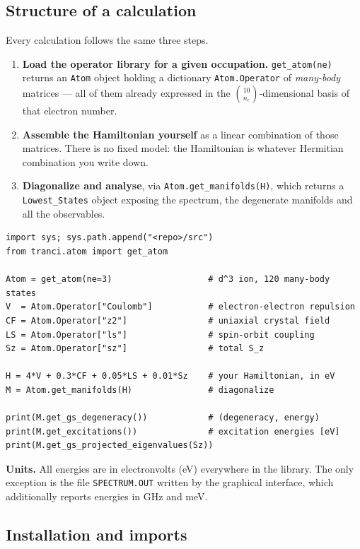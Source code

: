 \documentclass[11pt,a4paper]{article}
\newcommand{\op}[1]{\texttt{#1}}
\begin{document}
\subsection{Structure of a calculation}

Every calculation follows the same three steps.

\begin{enumerate}
\item \textbf{Load the operator library for a given occupation.}
      \op{get\_atom(ne)} returns an \op{Atom} object holding a dictionary
      \op{Atom.Operator} of \emph{many-body} matrices --- all of them already
      expressed in the $\binom{10}{n_e}$-dimensional basis of that electron
      number.
\item \textbf{Assemble the Hamiltonian yourself} as a linear combination of
      those matrices.  There is no fixed model: the Hamiltonian is whatever
      Hermitian combination you write down.
\item \textbf{Diagonalize and analyse}, via
      \op{Atom.get\_manifolds(H)}, which returns a \op{Lowest\_States} object
      exposing the spectrum, the degenerate manifolds and all the observables.
\end{enumerate}

\begin{lstlisting}
import sys; sys.path.append("<repo>/src")
from tranci.atom import get_atom

Atom = get_atom(ne=3)                   # d^3 ion, 120 many-body states
V  = Atom.Operator["Coulomb"]           # electron-electron repulsion
CF = Atom.Operator["z2"]                # uniaxial crystal field
LS = Atom.Operator["ls"]                # spin-orbit coupling
Sz = Atom.Operator["sz"]                # total S_z

H = 4*V + 0.3*CF + 0.05*LS + 0.01*Sz    # your Hamiltonian, in eV
M = Atom.get_manifolds(H)               # diagonalize

print(M.get_gs_degeneracy())            # (degeneracy, energy)
print(M.get_excitations())              # excitation energies [eV]
print(M.get_gs_projected_eigenvalues(Sz))
\end{lstlisting}

\noindent
\textbf{Units.}  All energies are in electronvolts (eV) everywhere in the
library.  The only exception is the file \op{SPECTRUM.OUT} written by the
graphical interface, which additionally reports energies in GHz and meV.

\subsection{Installation and imports}
\end{document}
